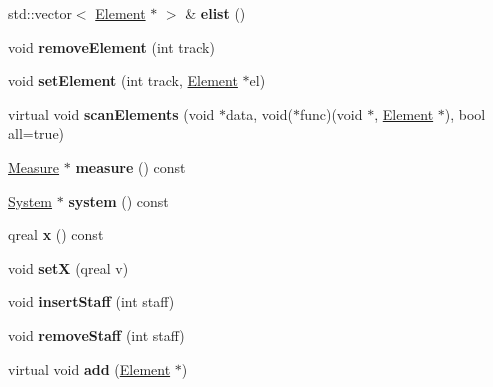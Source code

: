 \begin{DoxyCompactItemize}
std\+::vector$<$ \hyperlink{class_ms_1_1_element}{Element} $\ast$ $>$ \& {\bfseries elist} ()
\item 
\mbox{\label{class_ms_1_1_segment_abd1fd5a7d7a5cff8929cb8cbc1301db8}} 
void {\bfseries remove\+Element} (int track)
\item 
\mbox{\label{class_ms_1_1_segment_abd202529f56fe3135e6465c349b430fa}} 
void {\bfseries set\+Element} (int track, \hyperlink{class_ms_1_1_element}{Element} $\ast$el)
\item 
\mbox{\label{class_ms_1_1_segment_a4c6f5acc5ed3bef470cec6975a85ff00}} 
virtual void {\bfseries scan\+Elements} (void $\ast$data, void($\ast$func)(void $\ast$, \hyperlink{class_ms_1_1_element}{Element} $\ast$), bool all=true)
\item 
\mbox{\label{class_ms_1_1_segment_a44dc6d5b22a75152673060bc059acfb9}} 
\hyperlink{class_ms_1_1_measure}{Measure} $\ast$ {\bfseries measure} () const
\item 
\mbox{\label{class_ms_1_1_segment_ac55f422eeb641115fd88da2c278a3514}} 
\hyperlink{class_ms_1_1_system}{System} $\ast$ {\bfseries system} () const
\item 
\mbox{\label{class_ms_1_1_segment_a51315f172c11346e052b282b5053f453}} 
qreal {\bfseries x} () const
\item 
\mbox{\label{class_ms_1_1_segment_a4c3a13cc57a6e854151ce75fe5fa7752}} 
void {\bfseries setX} (qreal v)
\item 
\mbox{\label{class_ms_1_1_segment_a067cdce1b36d6e9ea5428b1cb05e8b04}} 
void {\bfseries insert\+Staff} (int staff)
\item 
\mbox{\label{class_ms_1_1_segment_aa38dbd980653d24cd1d3343f66fdfb8e}} 
void {\bfseries remove\+Staff} (int staff)
\item 
\mbox{\label{class_ms_1_1_segment_a10398c932dd7b82d6916402c1e26dfd7}} 
virtual void {\bfseries add} (\hyperlink{class_ms_1_1_element}{Element} $\ast$)

\end{DoxyCompactItemize}
